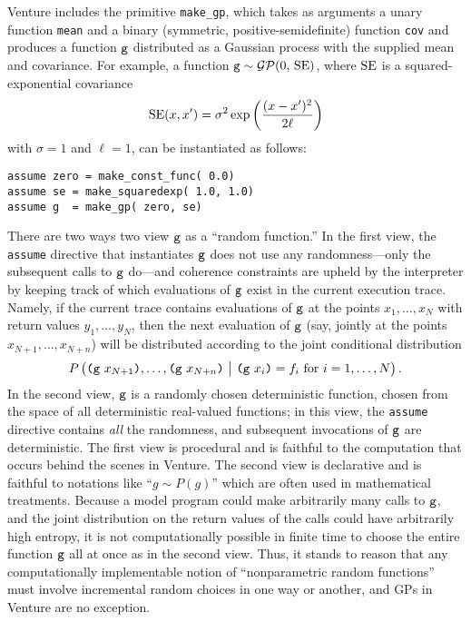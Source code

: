 Venture includes the primitive \texttt{make\_gp}, which takes as arguments a
unary function \texttt{mean} and a binary (symmetric, positive-semidefinite)
function \texttt{cov} and produces a function $\texttt{g}$ distributed as a Gaussian
process with the supplied mean and covariance.  For example, a function $\texttt{g}
\sim \mathcal{GP}(0,\,\operatorname{SE})$, where $\operatorname{SE}$ is a squared-exponential covariance
\[ \operatorname{SE}(x, x') = \sigma^2 \exp\left( \frac{(x-x')^2}{2\ell} \right) \]
with $\sigma=1$ and $\ell=1$, can be instantiated as follows:
\begin{lstlisting}[language=Venture]
assume zero = make_const_func( 0.0)
assume se = make_squaredexp( 1.0, 1.0)
assume g  = make_gp( zero, se)
\end{lstlisting}
There are two ways two view $\texttt{g}$ as a ``random function.'' In the first view,
the \texttt{assume} directive that instantiates $\texttt{g}$ does not use any
randomness---only the subsequent calls to $\texttt{g}$ do---and coherence constraints
are upheld by the interpreter by keeping track of which evaluations of $\texttt{g}$
exist in the current execution trace.  Namely, if the current trace contains evaluations
of $\texttt{g}$ at the points $x_1,\ldots,x_N$ with return values $y_1,\ldots,y_N$,
then the next evaluation of $\texttt{g}$ (say, jointly at the points $x_{N+1}, \ldots,
x_{N+n}$) will be distributed according to the joint conditional distribution
\[
  P\left( \big.
    \texttt(\texttt{g}\ x_{N+1}\texttt), \ldots, \texttt(\texttt{g}\ x_{N+n}\texttt)
    \ \middle\vert\ 
    \texttt(\texttt{g}\ x_i\texttt) = f_i \text{ for $i=1,\ldots,N$} \right).
\]
In the second view, $\texttt{g}$ is a randomly chosen deterministic function, chosen
from the space of all deterministic real-valued functions; in this view, the
\texttt{assume} directive contains \emph{all} the randomness, and subsequent
invocations of $\texttt{g}$ are deterministic.  The first view is procedural and is
faithful to the computation that occurs behind the scenes in Venture.  The
second view is declarative and is faithful to notations like ``$g \sim P(g)$''
which are often used in mathematical treatments.  Because a model program could
make arbitrarily many calls to $\texttt{g}$, and the joint distribution on the return
values of the calls could have arbitrarily high entropy, it is not
computationally possible in finite time to choose the entire function $\texttt{g}$ all
at once as in the second view.  Thus, it stands to reason that any
computationally implementable notion of ``nonparametric random functions'' must
involve incremental random choices in one way or another, and \ac{GP}s
in Venture are no exception.
